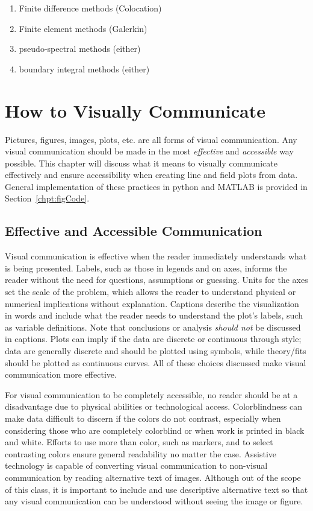 {
\centering
\begin{enumerate}
\item Finite difference methods (Colocation)
\item Finite element methods (Galerkin)
\item pseudo-spectral methods (either)
\item boundary integral methods (either)

\end{enumerate}
}

\section{How to Visually Communicate}
\label{chpt:visComm}


 Pictures, figures, images, plots, etc. are all forms of visual communication. Any visual communication should be made in the most \textit{effective} and \textit{accessible} way possible. This chapter will discuss what it means to visually communicate effectively and ensure accessibility when creating line and field plots from data. General implementation of these practices in python and MATLAB is provided in Section~\ref{chpt:figCode}. 


\subsection{Effective and Accessible Communication}
\label{chpt:effectiveFigs}
Visual communication is effective when the reader immediately understands what is being presented. Labels, such as those in legends and on axes, informs the reader without the need for questions, assumptions or guessing. Units for the axes set the scale of the problem, which allows the reader to understand physical or numerical implications without explanation. Captions describe the visualization in words and include what the reader needs to understand the plot's labels, such as variable definitions. Note that conclusions or analysis \textit{should not} be discussed in captions. Plots can imply if the data are discrete or continuous through style; data are generally discrete and should be plotted using symbols, while theory/fits should be plotted as continuous curves. All of these choices discussed make visual communication more effective.

For visual communication to be completely accessible, no reader should be at a disadvantage due to physical abilities or technological access. Colorblindness can make data difficult to discern if the colors do not contrast, especially when considering those who are completely colorblind or when work is printed in black and white. Efforts to use more than color, such as markers, and to select contrasting colors ensure general readability no matter the case. Assistive technology is capable of converting visual communication to non-visual communication by reading alternative text of images. Although out of the scope of this class, it is important to include and use descriptive alternative text so that any visual communication can be understood without seeing the image or figure. 

